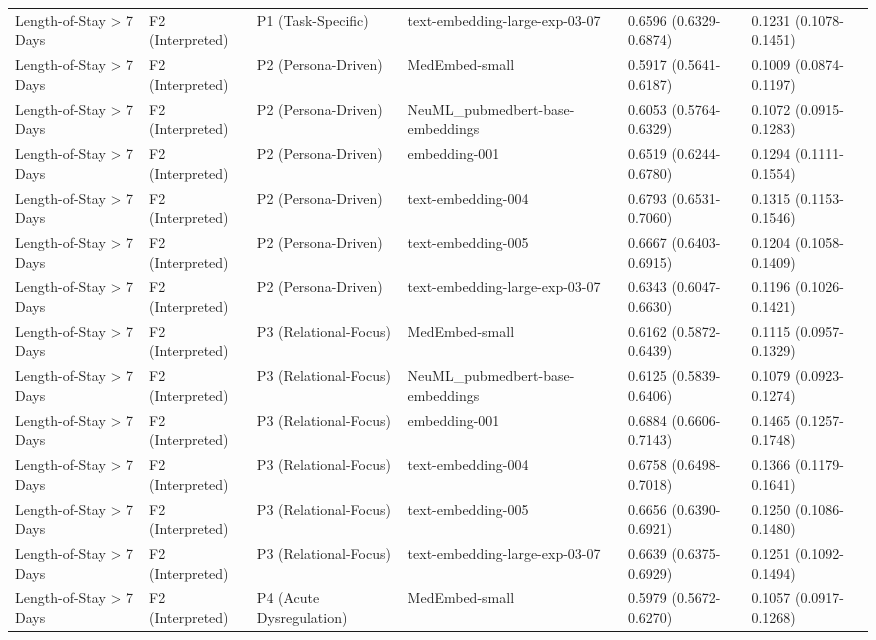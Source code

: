 \begin{tabular}{llllll}
Length-of-Stay \textgreater{} 7 Days & F2 (Interpreted) & P1 (Task-Specific) & text-embedding-large-exp-03-07 & 0.6596 (0.6329-0.6874) & 0.1231 (0.1078-0.1451) \\
Length-of-Stay \textgreater{} 7 Days & F2 (Interpreted) & P2 (Persona-Driven) & MedEmbed-small & 0.5917 (0.5641-0.6187) & 0.1009 (0.0874-0.1197) \\
Length-of-Stay \textgreater{} 7 Days & F2 (Interpreted) & P2 (Persona-Driven) & NeuML\_pubmedbert-base-embeddings & 0.6053 (0.5764-0.6329) & 0.1072 (0.0915-0.1283) \\
Length-of-Stay \textgreater{} 7 Days & F2 (Interpreted) & P2 (Persona-Driven) & embedding-001 & 0.6519 (0.6244-0.6780) & 0.1294 (0.1111-0.1554) \\
Length-of-Stay \textgreater{} 7 Days & F2 (Interpreted) & P2 (Persona-Driven) & text-embedding-004 & 0.6793 (0.6531-0.7060) & 0.1315 (0.1153-0.1546) \\
Length-of-Stay \textgreater{} 7 Days & F2 (Interpreted) & P2 (Persona-Driven) & text-embedding-005 & 0.6667 (0.6403-0.6915) & 0.1204 (0.1058-0.1409) \\
Length-of-Stay \textgreater{} 7 Days & F2 (Interpreted) & P2 (Persona-Driven) & text-embedding-large-exp-03-07 & 0.6343 (0.6047-0.6630) & 0.1196 (0.1026-0.1421) \\
Length-of-Stay \textgreater{} 7 Days & F2 (Interpreted) & P3 (Relational-Focus) & MedEmbed-small & 0.6162 (0.5872-0.6439) & 0.1115 (0.0957-0.1329) \\
Length-of-Stay \textgreater{} 7 Days & F2 (Interpreted) & P3 (Relational-Focus) & NeuML\_pubmedbert-base-embeddings & 0.6125 (0.5839-0.6406) & 0.1079 (0.0923-0.1274) \\
Length-of-Stay \textgreater{} 7 Days & F2 (Interpreted) & P3 (Relational-Focus) & embedding-001 & 0.6884 (0.6606-0.7143) & 0.1465 (0.1257-0.1748) \\
Length-of-Stay \textgreater{} 7 Days & F2 (Interpreted) & P3 (Relational-Focus) & text-embedding-004 & 0.6758 (0.6498-0.7018) & 0.1366 (0.1179-0.1641) \\
Length-of-Stay \textgreater{} 7 Days & F2 (Interpreted) & P3 (Relational-Focus) & text-embedding-005 & 0.6656 (0.6390-0.6921) & 0.1250 (0.1086-0.1480) \\
Length-of-Stay \textgreater{} 7 Days & F2 (Interpreted) & P3 (Relational-Focus) & text-embedding-large-exp-03-07 & 0.6639 (0.6375-0.6929) & 0.1251 (0.1092-0.1494) \\
Length-of-Stay \textgreater{} 7 Days & F2 (Interpreted) & P4 (Acute Dysregulation) & MedEmbed-small & 0.5979 (0.5672-0.6270) & 0.1057 (0.0917-0.1268) \\

\end{tabular}
